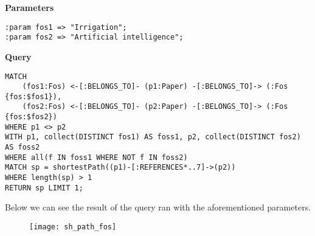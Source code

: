 \begin{enumerate}
    \textbf{Parameters}
    \begin{lstlisting}[label={lst:lstlisting49}]
:param fos1 => "Irrigation";
:param fos2 => "Artificial intelligence";
    \end{lstlisting}
    \textbf{Query}
    \begin{lstlisting}[label={lst:lstlisting50}]
MATCH
    (fos1:Fos) <-[:BELONGS_TO]- (p1:Paper) -[:BELONGS_TO]-> (:Fos {fos:$fos1}),
    (fos2:Fos) <-[:BELONGS_TO]- (p2:Paper) -[:BELONGS_TO]-> (:Fos {fos:$fos2})
WHERE p1 <> p2
WITH p1, collect(DISTINCT fos1) AS foss1, p2, collect(DISTINCT fos2) AS foss2
WHERE all(f IN foss1 WHERE NOT f IN foss2)
MATCH sp = shortestPath((p1)-[:REFERENCES*..7]->(p2))
WHERE length(sp) > 1
RETURN sp LIMIT 1;
    \end{lstlisting}
    Below we can see the result of the query ran with the aforementioned parameters.
    \begin{figure}[H]
        \begin{center}
            \texttt{[image: sh\_path\_fos]}
            \label{fig:sh_path_fos}%
        \end{center}
    \end{figure}
\end{enumerate}
